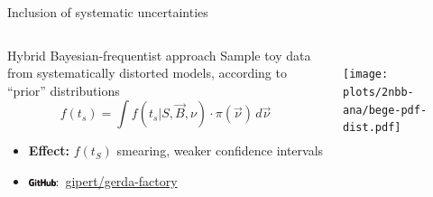 \documentclass[10pt,aspectratio=169]{beamer}
\newcommand{\github}[1]{\includegraphics[height=6pt]{logos/gihub-logo.png}:~\href{https://github.com/#1}{#1}}
\begin{document}
\begin{frame}{Inclusion of systematic uncertainties}
  \begin{columns}
    \begin{column}{0.55\textwidth}
      \begin{alertblock}{Hybrid Bayesian-frequentist approach}
        Sample toy data from systematically distorted models,
        according to ``prior'' distributions
        \[
          f(t_s) = \int f(t_s | S, \vec{B}, \nu) \cdot \pi(\vec{\nu}) \, d\vec{\nu}
        \]
      \end{alertblock}
      \begin{itemize}
        \item \textbf{Effect:} $f(t_S)$ smearing, weaker confidence intervals
        \item\github{gipert/gerda-factory}
      \end{itemize}
    \end{column}
    \begin{column}{0.45\textwidth}
      \centering
      \vspace*{0.5cm} \\
      \texttt{[image: plots/2nbb-ana/bege-pdf-dist.pdf]}
    \end{column}
  \end{columns}
\end{frame}
\end{document}
